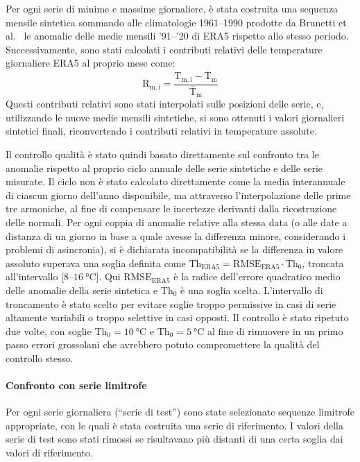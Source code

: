 Per ogni serie di minime e massime giornaliere, è stata costruita una sequenza mensile sintetica sommando alle climatologie 1961--1990 prodotte da Brunetti et al.~\cite{brunettiHighresolutionTemperatureClimatology2014} le anomalie delle medie mensili '91--'20 di ERA5 rispetto allo stesso periodo. Successivamente, sono stati calcolati i contributi relativi delle temperature giornaliere ERA5 al proprio mese come:
\[\mathrm{R_{m,i}} = \frac{\mathrm{T_{m,i}} - \mathrm{\overline{T}_m}}{\mathrm{\overline{T}_m}}\]
Questi contributi relativi sono stati interpolati sulle posizioni delle serie, e, utilizzando le nuove medie mensili sintetiche, si sono ottenuti i valori giornalieri sintetici finali, riconvertendo i contributi relativi in temperature assolute.

Il controllo qualità è stato quindi basato direttamente sul confronto tra le anomalie rispetto al proprio ciclo annuale delle serie sintetiche e delle serie misurate. Il ciclo non è stato calcolato direttamente come la media interannuale di ciascun giorno dell'anno disponibile, ma attraverso l'interpolazione delle prime tre armoniche, al fine di compensare le incertezze derivanti dalla ricostruzione delle normali. Per ogni coppia di anomalie relative alla stessa data (o alle date a distanza di un giorno in base a quale avesse la differenza minore, considerando i problemi di asincronia), si è dichiarata incompatibilità se la differenza in valore assoluto superava una soglia definita come \(\mathrm{Th_{ERA5}} = \mathrm{RMSE_{ERA5}}\cdot\mathrm{Th_0}\), troncata all'intervallo [\(\num{8}\)--\(\qty{16}{\degreeCelsius}\)]. Qui \(\mathrm{RMSE_{ERA5}}\) è la radice dell'errore quadratico medio delle anomalie della serie sintetica e \(\mathrm{Th_0}\) è una soglia scelta. L'intervallo di troncamento è stato scelto per evitare soglie troppo permissive in casi di serie altamente variabili o troppo selettive in casi opposti. Il controllo è stato ripetuto due volte, con soglie \(\mathrm{Th_0} = \qty{10}{\degreeCelsius}\) e \(\mathrm{Th_0} = \qty{5}{\degreeCelsius}\) al fine di rimuovere in un primo passo errori grossolani che avrebbero potuto compromettere la qualità del controllo stesso.

\paragraph{Confronto con serie limitrofe}\label{ch:close-series}
Per ogni serie giornaliera (``serie di test'') sono state selezionate sequenze limitrofe appropriate, con le quali è stata costruita una serie di riferimento. I valori della serie di test sono stati rimossi se risultavano più distanti di una certa soglia dai valori di riferimento.

